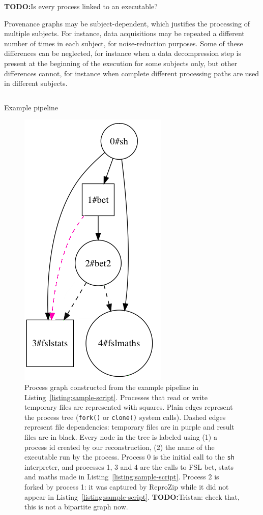 \documentclass[a4paper,num-refs]{oup-contemporary}
\newcommand{\todo}[1]{\color{red}\textbf{TODO:}#1\color{black}}
\newcommand{\reprozip}[0]{ReproZip\xspace}
\begin{document}
\todo{Is every process linked to an executable?}

Provenance graphs may be subject-dependent, which justifies the processing
of multiple subjects. For instance, data acquisitions may be
repeated a different number of times in each subject, for noise-reduction
purposes. Some of these differences can be neglected, for instance when a
data decompression step is present at the beginning of the execution for
some subjects only, but other differences cannot, for instance
when complete different processing paths are used in different subjects. 

\begin{listing}
  \inputminted{bash}{"bin/example.sh"}
  \caption{Example pipeline}
  \label{listing:sample-script}
\end{listing}

\begin{figure}
\centering
  \includegraphics[width=0.3\columnwidth]{images/simple_graph}
  \caption{Process graph
  constructed from the example pipeline in
  Listing~\ref{listing:sample-script}.
  Processes that read or write
  temporary files are 
  represented with squares. Plain edges 
  represent the process tree (\texttt{fork()} or \texttt{clone()} 
  system calls). Dashed edges represent file dependencies: temporary 
  files are in purple and result files are in black.
  Every node in the tree is labeled using (1) a process id created by our
  reconstruction, (2) the name of the executable run by the process.
  Process 0 is the initial call to the \texttt{sh} interpreter, and
  processes 1, 3 and 4 are the calls to FSL bet, stats and maths made in
  Listing~\ref{listing:sample-script}. Process 2 is forked by process 1: it
  was captured by \reprozip while it did not appear in
  Listing~\ref{listing:sample-script}. \todo{Tristan: check that, this is not a bipartite graph now}. 
}
  \label{fig:simple_script}
\end{figure}
\end{document}
